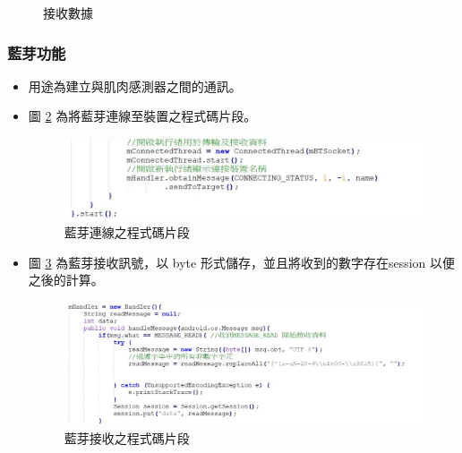 \documentclass[12pt]{article}  %
\theoremstyle{plain}
\begin{document}
\begin{itemize}
\begin{itemize}
\begin{figure}[htbp]
\caption{接收數據} \label{C接收數據}
\end{figure}
\end{itemize}
\newpage
\end{itemize}

\subsubsection{藍芽功能}
\begin{itemize}
\item 用途為建立與肌肉感測器之間的通訊。
\item 圖 \ref{藍芽連線之程式碼片段} 為將藍芽連線至裝置之程式碼片段。
\begin{figure}[htbp]
\centering
\includegraphics[width=15cm]{pic/ch2/code-BluetoothActivity.JPG}
\caption{藍芽連線之程式碼片段} \label{藍芽連線之程式碼片段}
\end{figure}

\item 圖 \ref{藍芽接收之程式碼片段} 為藍芽接收訊號，以 byte 形式儲存，並且將收到的數字存在session 以便之後的計算。
\begin{figure}[htbp]
\centering
\includegraphics[width=15cm]{pic/ch2/code-BluetoothActivity2.JPG}
\caption{藍芽接收之程式碼片段} \label{藍芽接收之程式碼片段}
\end{figure}
\end{itemize}
\end{document}
